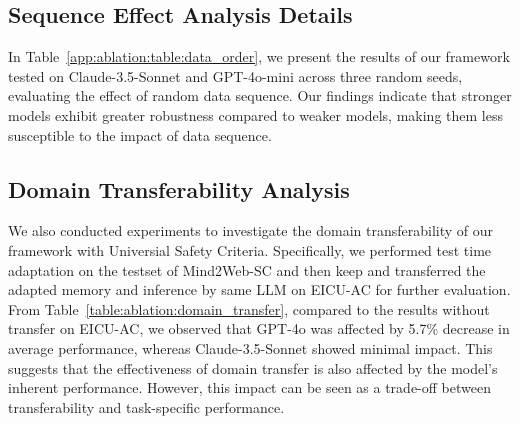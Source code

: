 \subsection{Sequence Effect Analysis Details}
\label{appendix:ablation_study:order_effect_analysis}
In Table~\ref{app:ablation:table:data_order}, we present the results of our framework tested on Claude-3.5-Sonnet and GPT-4o-mini across three random seeds, evaluating the effect of random data sequence. Our findings indicate that stronger models exhibit greater robustness compared to weaker models, making them less susceptible to the impact of data sequence.

\subsection{Domain Transferability Analysis}
\label{appendix:ablation_study:domain_transferability_analysis}
We also conducted experiments to investigate the domain transferability of our framework with Universial Safety Criteria. Specifically, we performed test time adaptation on the testset of Mind2Web-SC and then keep and transferred the adapted memory and inference by same LLM on EICU-AC for further evaluation. From Table~\ref{table:ablation:domain_transfer}, compared to the results without transfer on EICU-AC, we observed that GPT-4o was affected by 5.7\% decrease in average performance, whereas Claude-3.5-Sonnet showed minimal impact. This suggests that the effectiveness of domain transfer is also affected by the model's inherent performance. However, this impact can be seen as a trade-off between transferability and task-specific performance.
